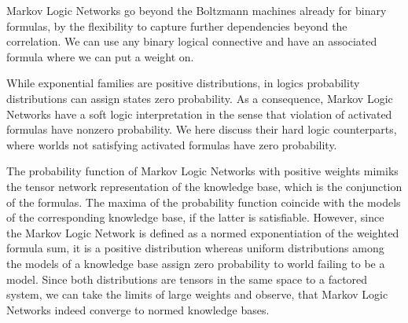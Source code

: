 


Markov Logic Networks go beyond the Boltzmann machines already for binary formulas, by the flexibility to capture further dependencies beyond the correlation.
We can use any binary logical connective and have an associated formula where we can put a weight on.














\label{sec:hardNetworks} %

While exponential families are positive distributions, in logics probability distributions can assign states zero probability.
As a consequence, Markov Logic Networks have a soft logic interpretation in the sense that violation of activated formulas have nonzero probability.
We here discuss their hard logic counterparts, where worlds not satisfying activated formulas have zero probability.

\label{sec:hardLogicLimit} %

The probability function of Markov Logic Networks with positive weights mimiks the tensor network representation of the knowledge base, which is the conjunction of the formulas. 
The maxima of the probability function coincide with the models of the corresponding knowledge base, if the latter is satisfiable.
However, since the Markov Logic Network is defined as a normed exponentiation of the weighted formula sum, it is a positive distribution whereas uniform distributions among the models of a knowledge base assign zero probability to world failing to be a model.
Since both distributions are tensors in the same space to a factored system, we can take the limits of large weights and observe, that Markov Logic Networks indeed converge to normed knowledge bases.


